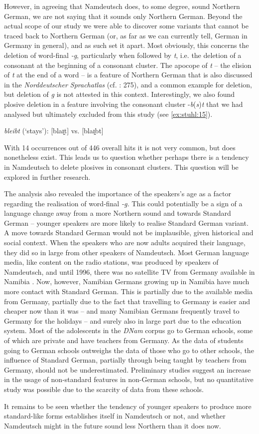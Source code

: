 \documentclass[output=paper]{langsci/langscibook}
\begin{document}
However, in agreeing that Namdeutsch does, to some degree, sound Northern German, we are not saying that it sounds only Northern German. Beyond the actual scope of our study we were able to discover some variants that cannot be traced back to Northern German (or, as far as we can currently tell, German in Germany in general), and as such set it apart. Most obviously, this concerns the deletion of word-final \textit{-g}, particularly when followed by \textit{t}, i.e. the deletion of a consonant at the beginning of a consonant cluster. The apocope of \textit{t} – the elision of \textit{t} at the end of a word – is a feature of Northern German that is also discussed in the \textit{Norddeutscher Sprachatlas} (cf. \citealt{elmentaler_norddeutscher_2015}: 275), and a common example for deletion, but deletion of \textit{g} is not attested in this context. Interestingly, we also found plosive deletion in a feature involving the consonant cluster -\textit{b}(\textit{s})\textit{t} that we had analysed but ultimately excluded from this study (see \ref{ex:stuhl:15}). 

 
\ea
\label{ex:stuhl:15}
\textit{bleibt} (‘stays’): [blaɪ̯⁠t] vs. [blaɪ̯b⁠t]
\z
 
 
With 14 occurrences out of 446 overall hits it is not very common, but does nonetheless exist. This leads us to question whether perhaps there is a tendency in Namdeutsch to delete plosives in consonant clusters. This question will be explored in further research.

The analysis also revealed the importance of the speakers’s age as a factor regarding the realisation of word-final \textit{-g.} This could potentially be a sign of a language change away from a more Northern sound and towards Standard German -- younger speakers are more likely to realise Standard German variant. A move towards Standard German would not be implausible, given historical and social context. When the speakers who are now adults acquired their language, they did so in large from other speakers of Namdeutsch. Most German language media, like content on the radio stations, was produced by speakers of Namdeutsch, and until 1996, there was no satellite TV from Germany available in Namibia \citep[25]{kroll-tjingaete_strukturelle_2018}. Now, however, Namibian Germans growing up in Namibia have much more contact with Standard German. This is partially due to the available media from Germany, partially due to the fact that travelling to Germany is easier and cheaper now than it was – and many Namibian Germans frequently travel to Germany for the holidays – and surely also in large part due to the education system. Most of the adolescents in the \textit{DNam} corpus go to German schools, some of which are private and have teachers from Germany. As the data of students going to German schools outweighs the data of those who go to other schools, the influence of Standard German, partially through being taught by teachers from Germany, should not be underestimated. Preliminary studies suggest an increase in the usage of non-standard features in non-German schools, but no quantitative study was possible due to the scarcity of data from these schools.

It remains to be seen whether the tendency of younger speakers to produce more standard-like forms establishes itself in Namdeutsch or not, and whether Namdeutsch might in the future sound less Northern than it does now.

{\sloppy\printbibliography[heading=subbibliography,notkeyword=this]}
\end{document}
